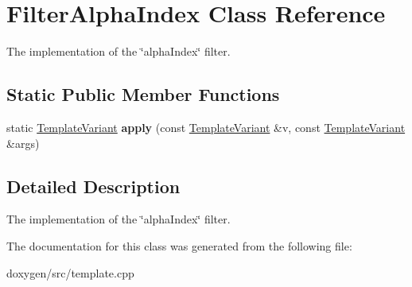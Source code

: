 \hypertarget{class_filter_alpha_index}{}\section{Filter\+Alpha\+Index Class Reference}
\label{class_filter_alpha_index}


The implementation of the \char`\"{}alpha\+Index\char`\"{} filter.  


\subsection*{Static Public Member Functions}
\begin{DoxyCompactItemize}
\item 
\mbox{\label{class_filter_alpha_index_a2820c05a94a2b02d444ec7d1eb7918c0}} 
static \mbox{\hyperlink{class_template_variant}{Template\+Variant}} {\bfseries apply} (const \mbox{\hyperlink{class_template_variant}{Template\+Variant}} \&v, const \mbox{\hyperlink{class_template_variant}{Template\+Variant}} \&args)
\end{DoxyCompactItemize}


\subsection{Detailed Description}
The implementation of the \char`\"{}alpha\+Index\char`\"{} filter. 

The documentation for this class was generated from the following file\+:\begin{DoxyCompactItemize}
\item 
doxygen/src/template.\+cpp\end{DoxyCompactItemize}
